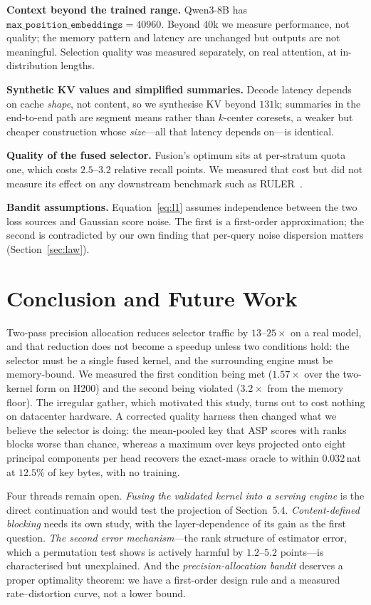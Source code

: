 \documentclass[sigconf,nonacm,11pt]{acmart}
\begin{document}
\textbf{Context beyond the trained range.} Qwen3-8B has
$\texttt{max\_position\_embeddings}=40960$. Beyond $40$k we measure performance,
not quality; the memory pattern and latency are unchanged but outputs are not
meaningful. Selection quality was measured separately, on real attention, at
in-distribution lengths.

\textbf{Synthetic KV values and simplified summaries.} Decode latency depends on
cache \emph{shape}, not content, so we synthesise KV beyond $131$k; summaries in
the end-to-end path are segment means rather than $k$-center coresets, a weaker
but cheaper construction whose \emph{size}---all that latency depends on---is
identical.

\textbf{Quality of the fused selector.} Fusion's optimum sits at per-stratum
quota one, which costs $2.5$--$3.2$ relative recall points. We measured that cost
but did not measure its effect on any downstream benchmark such as
RULER~\cite{hsieh2024ruler}.

\textbf{Bandit assumptions.} Equation~\eqref{eq:l1} assumes independence between
the two loss sources and Gaussian score noise. The first is a first-order
approximation; the second is contradicted by our own finding that per-query noise
dispersion matters (Section~\ref{sec:law}).

\section{Conclusion and Future Work}

Two-pass precision allocation reduces selector traffic by $13$--$25\times$ on a
real model, and that reduction does not become a speedup unless two conditions
hold: the selector must be a single fused kernel, and the surrounding engine must
be memory-bound. We measured the first condition being met ($1.57\times$ over the
two-kernel form on H200) and the second being violated ($3.2\times$ from the
memory floor). The irregular gather, which motivated this study, turns out to cost
nothing on datacenter hardware. A corrected quality harness then changed what we
believe the selector is doing: the mean-pooled key that ASP scores with ranks
blocks worse than chance, whereas a maximum over keys projected onto eight
principal components per head recovers the exact-mass oracle to within
$0.032$\,nat at $12.5\%$ of key bytes, with no training.

Four threads remain open. \emph{Fusing the validated kernel into a serving
engine} is the direct continuation and would test the projection of
Section~5.4. \emph{Content-defined blocking} needs its own study, with the
layer-dependence of its gain as the first question. \emph{The second error
mechanism}---the rank structure of estimator error, which a permutation test
shows is actively harmful by $1.2$--$5.2$ points---is characterised but
unexplained. And the \emph{precision-allocation bandit} deserves a proper
optimality theorem: we have a first-order design rule and a measured
rate--distortion curve, not a lower bound.



\end{document}
